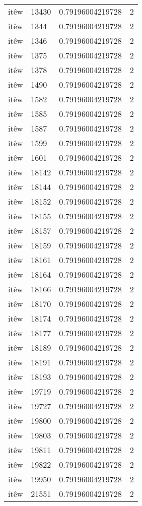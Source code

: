 \begin{longtable}{llll}
itêw & 13430 & 0.79196004219728 & 2\\
itêw & 1344 & 0.79196004219728 & 2\\
itêw & 1346 & 0.79196004219728 & 2\\
itêw & 1375 & 0.79196004219728 & 2\\
itêw & 1378 & 0.79196004219728 & 2\\
itêw & 1490 & 0.79196004219728 & 2\\
itêw & 1582 & 0.79196004219728 & 2\\
itêw & 1585 & 0.79196004219728 & 2\\
itêw & 1587 & 0.79196004219728 & 2\\
itêw & 1599 & 0.79196004219728 & 2\\
itêw & 1601 & 0.79196004219728 & 2\\
itêw & 18142 & 0.79196004219728 & 2\\
itêw & 18144 & 0.79196004219728 & 2\\
itêw & 18152 & 0.79196004219728 & 2\\
itêw & 18155 & 0.79196004219728 & 2\\
itêw & 18157 & 0.79196004219728 & 2\\
itêw & 18159 & 0.79196004219728 & 2\\
itêw & 18161 & 0.79196004219728 & 2\\
itêw & 18164 & 0.79196004219728 & 2\\
itêw & 18166 & 0.79196004219728 & 2\\
itêw & 18170 & 0.79196004219728 & 2\\
itêw & 18174 & 0.79196004219728 & 2\\
itêw & 18177 & 0.79196004219728 & 2\\
itêw & 18189 & 0.79196004219728 & 2\\
itêw & 18191 & 0.79196004219728 & 2\\
itêw & 18193 & 0.79196004219728 & 2\\
itêw & 19719 & 0.79196004219728 & 2\\
itêw & 19727 & 0.79196004219728 & 2\\
itêw & 19800 & 0.79196004219728 & 2\\
itêw & 19803 & 0.79196004219728 & 2\\
itêw & 19811 & 0.79196004219728 & 2\\
itêw & 19822 & 0.79196004219728 & 2\\
itêw & 19950 & 0.79196004219728 & 2\\
itêw & 21551 & 0.79196004219728 & 2\\

\end{longtable}
